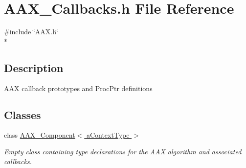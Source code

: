 \hypertarget{a00163}{}\section{A\+A\+X\+\_\+\+Callbacks.\+h File Reference}
\label{a00163}
{\ttfamily \#include \char`\"{}A\+A\+X.\+h\char`\"{}}\\*


\subsection{Description}
A\+A\+X callback prototypes and Proc\+Ptr definitions 

\subsection*{Classes}
\begin{DoxyCompactItemize}
\item 
class \hyperlink{a00029}{A\+A\+X\+\_\+\+Component$<$ a\+Context\+Type $>$}
\begin{DoxyCompactList}\small\item\em Empty class containing type declarations for the A\+A\+X algorithm and associated callbacks. \end{DoxyCompactList}\end{DoxyCompactItemize}
